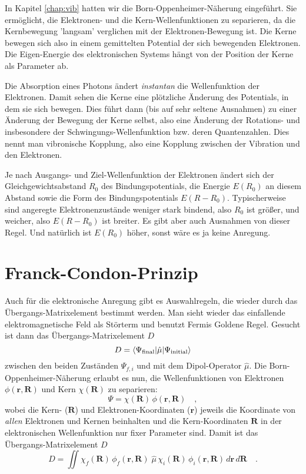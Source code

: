 In Kapitel \ref{chap:vib} hatten wir die Born-Oppenheimer-Näherung eingeführt. Sie ermöglicht, die Elektronen- und die Kern-Wellenfunktionen zu separieren, da die Kernbewegung 'langsam' verglichen mit der Elektronen-Bewegung ist. Die Kerne bewegen sich also in einem gemittelten Potential der sich bewegenden Elektronen. Die Eigen-Energie des elektronischen Systems hängt von der Position der Kerne als Parameter ab.

Die Absorption eines Photons ändert \emph{instantan} die Wellenfunktion der Elektronen. Damit sehen die Kerne eine plötzliche Änderung des Potentials, in dem sie sich bewegen. Dies führt dann (bis auf sehr seltene Ausnahmen) zu einer Änderung der Bewegung der Kerne selbst, also eine Änderung der Rotations- und insbesondere der Schwingungs-Wellenfunktion bzw. deren Quantenzahlen. Dies nennt man vibronische Kopplung, also eine Kopplung zwischen der Vibration und den Elektronen.

Je nach Ausgangs- und Ziel-Wellenfunktion der Elektronen ändert sich der Gleichgewichtsabstand $R_0$ des Bindungspotentials,  die Energie $E(R_0)$ an diesem 
Abstand sowie die Form des Bindungspotentials $E(R- R_0)$. Typischerweise  sind angeregte Elektronenzustände weniger stark bindend, also $R_0$ ist größer, und weicher, also $E(R- R_0)$ ist breiter. Es gibt aber auch Ausnahmen von dieser Regel.
Und natürlich ist $E(R_0)$ höher, sonst wäre es ja keine Anregung.

\section{Franck-Condon-Prinzip}


Auch für die elektronische Anregung gibt es Auswahlregeln, die wieder durch das Übergangs-Matrixelement bestimmt werden. Man sieht wieder das einfallende elektromagnetische  Feld als Störterm und benutzt Fermis Goldene Regel. Gesucht ist dann das Übergangs-Matrixelement $D$
\begin{equation}
 D = \braket{\Psi_\text{final} | \hat{\mu} | \Psi_\text{initial} }
\end{equation}
zwischen den beiden Zuständen $\Psi_{f,i}$ und mit dem Dipol-Operator $ \hat{\mu}$. Die Born-Oppenheimer-Näherung erlaubt es nun, die Wellenfunktionen von Elektronen $ \phi(\mathbf{r}, \mathbf{R})$ und Kern $ \chi(\mathbf{R}) $ zu separieren:
\begin{equation}
 \Psi = \chi(\mathbf{R}) \, \phi(\mathbf{r}, \mathbf{R}) \quad , \label{eq:elec_wf_FC}
\end{equation}
wobei die Kern- ($\mathbf{R}$) und Elektronen-Koordinaten ($\mathbf{r}$) jeweils die Koordinate von \emph{allen} Elektronen und Kernen beinhalten und die Kern-Koordinaten $\mathbf{R}$ in der elektronischen Wellenfunktion nur fixer Parameter sind. Damit ist das Übergangs-Matrixelement $D$
\begin{equation}
 D =  \iint  \chi_f(\mathbf{R}) \, \phi_f(\mathbf{r} , \mathbf{R}) \; \hat{\mu}
 \,  \chi_i(\mathbf{R}) \, \phi_i(\mathbf{r}, \mathbf{R}) \, d \mathbf{r} \, d \mathbf{R}  \quad .
\end{equation}


